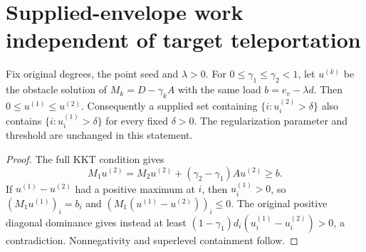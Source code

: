 \section{Supplied-envelope work independent of target teleportation}
\label{sec:op3-supplied-envelope-alpha-floor}

\begin{lemma}
\label{lem:op3-same-load-teleportation-monotonicity}
Fix original degrees, the point seed and $\lambda>0$.
For $0\leq\gamma_1\leq\gamma_2<1$, let $u^{(k)}$ be the obstacle
solution of $M_k=D-\gamma_kA$ with the same load
$b=e_v-\lambda d$. Then $0\leq u^{(1)}\leq u^{(2)}$.
Consequently a supplied set containing
$\{i:u_i^{(2)}>\delta\}$ also contains
$\{i:u_i^{(1)}>\delta\}$ for every fixed $\delta>0$.
The regularization parameter and threshold are unchanged in this statement.
\end{lemma}
\begin{proof}
The full KKT condition gives
\[
 M_1u^{(2)}=M_2u^{(2)}+(\gamma_2-\gamma_1)Au^{(2)}\geq b.
\]
If $u^{(1)}-u^{(2)}$ had a positive maximum at $i$, then
$u_i^{(1)}>0$, so $(M_1u^{(1)})_i=b_i$ and
$(M_1(u^{(1)}-u^{(2)}))_i\leq0$. The original positive diagonal
dominance gives instead at least
$(1-\gamma_1)d_i(u_i^{(1)}-u_i^{(2)})>0$, a contradiction.
Nonnegativity and superlevel containment follow.
\end{proof}

